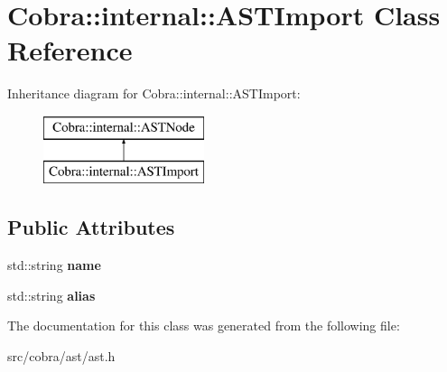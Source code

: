 \hypertarget{class_cobra_1_1internal_1_1_a_s_t_import}{\section{Cobra\+:\+:internal\+:\+:A\+S\+T\+Import Class Reference}
\label{class_cobra_1_1internal_1_1_a_s_t_import}
}
Inheritance diagram for Cobra\+:\+:internal\+:\+:A\+S\+T\+Import\+:\begin{figure}[H]
\begin{center}
\leavevmode
\includegraphics[height=2.000000cm]{class_cobra_1_1internal_1_1_a_s_t_import}
\end{center}
\end{figure}
\subsection*{Public Attributes}
\begin{DoxyCompactItemize}
\item 
\hypertarget{class_cobra_1_1internal_1_1_a_s_t_import_a69e0166ecf3c002a600cbeb1aaa71203}{std\+::string {\bfseries name}}\label{class_cobra_1_1internal_1_1_a_s_t_import_a69e0166ecf3c002a600cbeb1aaa71203}

\item 
\hypertarget{class_cobra_1_1internal_1_1_a_s_t_import_a813737b31c56fe6aed198af56605c2ce}{std\+::string {\bfseries alias}}\label{class_cobra_1_1internal_1_1_a_s_t_import_a813737b31c56fe6aed198af56605c2ce}

\end{DoxyCompactItemize}


The documentation for this class was generated from the following file\+:\begin{DoxyCompactItemize}
\item 
src/cobra/ast/ast.\+h\end{DoxyCompactItemize}
